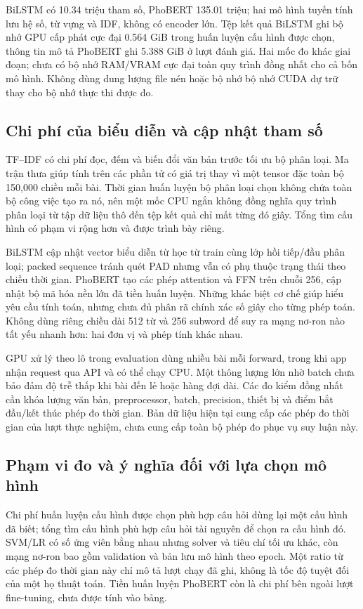 BiLSTM có 10.34 triệu tham số, PhoBERT 135.01 triệu; hai mô hình tuyến tính lưu hệ số, từ vựng và IDF, không có encoder lớn. Tệp kết quả BiLSTM ghi bộ nhớ GPU cấp phát cực đại 0.564 GiB trong huấn luyện cấu hình được chọn, thông tin mô tả PhoBERT ghi 5.388 GiB ở lượt đánh giá. Hai mốc đo khác giai đoạn; chưa có bộ nhớ RAM/VRAM cực đại toàn quy trình đồng nhất cho cả bốn mô hình. Không dùng dung lượng file nén hoặc bộ nhớ bộ nhớ CUDA dự trữ thay cho bộ nhớ thực thi được đo.



\subsection{Chi phí của biểu diễn và cập nhật tham số}
TF--IDF có chi phí đọc, đếm và biến đổi văn bản trước tối ưu bộ phân loại. Ma trận thưa giúp tính trên các phần tử có giá trị thay vì một tensor đặc toàn bộ 150,000 chiều mỗi bài. Thời gian huấn luyện bộ phân loại chọn không chứa toàn bộ công việc tạo ra nó, nên một mốc CPU ngắn không đồng nghĩa quy trình phân loại từ tập dữ liệu thô đến tệp kết quả chỉ mất từng đó giây. Tổng tìm cấu hình có phạm vi rộng hơn và được trình bày riêng.

BiLSTM cập nhật vector biểu diễn từ học từ train cùng lớp hồi tiếp/đầu phân loại; packed sequence tránh quét PAD nhưng vẫn có phụ thuộc trạng thái theo chiều thời gian. PhoBERT tạo các phép attention và FFN trên chuỗi 256, cập nhật bộ mã hóa nền lớn đã tiền huấn luyện. Những khác biệt cơ chế giúp hiểu yêu cầu tính toán, nhưng chưa đủ phân rã chính xác số giây cho từng phép toán. Không dùng riêng chiều dài 512 từ và 256 subword để suy ra mạng nơ-ron nào tất yếu nhanh hơn: hai đơn vị và phép tính khác nhau.

GPU xử lý theo lô trong evaluation dùng nhiều bài mỗi forward, trong khi app nhận request qua API và có thể chạy CPU. Một thông lượng lớn nhờ batch chưa bảo đảm độ trễ thấp khi bài đến lẻ hoặc hàng đợi dài. Các đo kiểm đồng nhất cần khóa lượng văn bản, preprocessor, batch, precision, thiết bị và điểm bắt đầu/kết thúc phép đo thời gian. Bản dữ liệu hiện tại cung cấp các phép đo thời gian của lượt thực nghiệm, chưa cung cấp toàn bộ phép đo phục vụ suy luận này.


\subsection{Phạm vi đo và ý nghĩa đối với lựa chọn mô hình}
Chi phí huấn luyện cấu hình được chọn phù hợp câu hỏi dùng lại một cấu hình đã biết; tổng tìm cấu hình phù hợp câu hỏi tài nguyên để chọn ra cấu hình đó. SVM/LR có số ứng viên bằng nhau nhưng solver và tiêu chí tối ưu khác, còn mạng nơ-ron bao gồm validation và bản lưu mô hình theo epoch. Một ratio từ các phép đo thời gian này chỉ mô tả lượt chạy đã ghi, không là tốc độ tuyệt đối của một họ thuật toán. Tiền huấn luyện PhoBERT còn là chi phí bên ngoài lượt fine-tuning, chưa được tính vào bảng.

